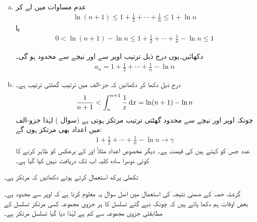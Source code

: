 \begin{enumerate}[a.]
\item
عدم مساوات  میں  لے کر 
\begin{align*}
\ln (n+1)\le 1+\frac{1}{2}+\cdots+\frac{1}{n}\le 1+\ln n
\end{align*}
یا 
\begin{align*}
0<\ln (n+1)-\ln n\le 1+\frac{1}{2}+\cdots+\frac{1}{n}-\ln n\le 1
\end{align*}

دکھائیں۔یوں درج ذیل ترتیب اوپر سے اور نیچے سے محدود ہو گی۔
\begin{align*}
a_n=1+\frac{1}{2}+\cdots+\frac{1}{n}-\ln n
\end{align*}
\item
درج ذیل دکھا کر دکھائیں کہ جز-الف میں ترتیب  گھٹتی ترتیب ہے۔
\begin{align*}
\frac{1}{n+1}<\int_n^{n+1}\frac{1}{x}\dif x=\ln (n+1)-\ln n
\end{align*} 
چونکہ اوپر اور نیچے سے محدود گھٹتی ترتیب مرتکز ہوتی ہے (سوال )  لہٰذا جزو-الف میں اعداد  بھی مرتکز ہوں گے:
\begin{align*}
1+\frac{1}{2}+\cdots+\frac{1}{n}-\ln n\to \gamma
\end{align*}
عدد  جس کو  کہتے ہیں کی قیمت  ہے۔ دیگر مخصوص اعداد مثلاً  اور  کے برعکس  کو ظاہر کرنے کا کوئی دوسرا  سادہ کلیہ اب تک دریافت نہیں کیا گیا ہے۔
\end{enumerate}
تکملی پرکھ استعمال کرتے ہوئے دکھائیں کہ  مرتکز ہے۔

گزشتہ حصہ کے ضمنی نتیجہ  کی استعمال میں اصل سوال یہ  معلوم کرنا ہے کہ  اوپر سے محدود ہے۔ بعض اوقات ہم دکھا پاتے ہیں کہ چونکہ دیے گئے تسلسل کا ہر جزوی مجموعہ  کسی مرتکز تسلسل کے  مطابقتی جزوی مجموعہ سے کم ہے لہٰذا دیا گیا تسلسل مرتکز ہے۔

